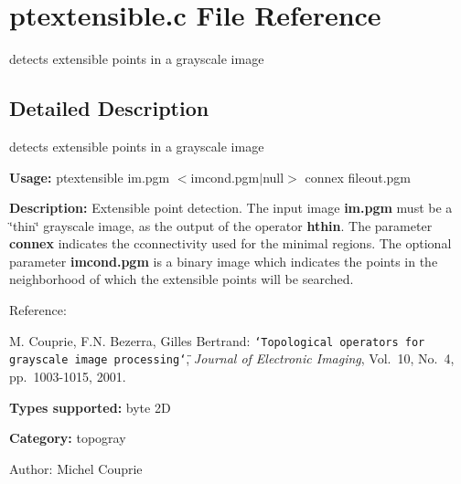 \section{ptextensible.c File Reference}
\label{ptextensible_8c}
detects extensible points in a grayscale image  




\label{_details}
\subsection{Detailed Description}
detects extensible points in a grayscale image 

{\bf Usage:} ptextensible im.pgm $<$imcond.pgm$|$null$>$ connex fileout.pgm

{\bf Description:} Extensible point detection. The input image {\bf im.pgm} must be a \char`\"{}thin\char`\"{} grayscale image, as the output of the operator {\bf hthin}. The parameter {\bf connex} indicates the cconnectivity used for the minimal regions. The optional parameter {\bf imcond.pgm} is a binary image which indicates the points in the neighborhood of which the extensible points will be searched.

Reference:\par
 M. Couprie, F.N. Bezerra, Gilles Bertrand: {\tt \char`\"{}Topological operators for grayscale image processing\char`\"{}}, {\em  Journal of Electronic Imaging\/}, Vol.~10, No.~4, pp.~1003-1015, 2001.

{\bf Types supported:} byte 2D

{\bf Category:} topogray

\begin{Desc}
\item[Author:]Michel Couprie \end{Desc}
